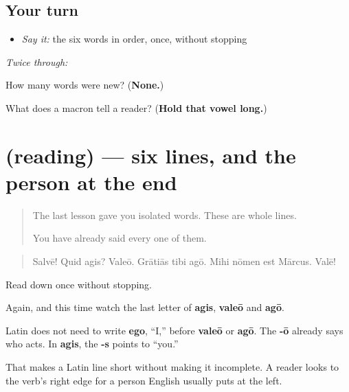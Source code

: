 \subsection*{Your turn}
\begin{itemize}
\raggedright
  \item \emph{Say it:} the six words in order, once, without stopping
\end{itemize}

\emph{Twice through:}

\begin{tcolorbox}[breakable,colback=teal!4,colframe=teal!35!black,title={Before you move on}]
How many words were new? (\textbf{None.})

What does a macron tell a reader? (\textbf{Hold that vowel long.})
\end{tcolorbox}
\section[(reading)]{(reading) — six lines, and the person at the end}

\label{lesson:LA-C58-lineae}



\begin{quote}
The last lesson gave you isolated words. These are whole lines.

You have already said every one of them.
\end{quote}

\begin{tcolorbox}[breakable,skin=enhanced,colback=orange!6,colframe=orange!45!black,boxrule=0.5pt,arc=1mm,left=6pt,right=6pt,top=4pt,bottom=4pt,fonttitle=\bfseries,title={Read this}]
\begin{quote}
Salvē! Quid agis? Valeō. Grātiās tibi agō. Mihi nōmen est Mārcus. Valē!
\end{quote}

Read down once without stopping.

Again, and this time watch the last letter of \textbf{agis}, \textbf{valeō} and \textbf{agō}.
\end{tcolorbox}

\begin{grammarlens}[title={Grammar Lens: the person rides on the verb}]
Latin does not need to write \textbf{ego}, “I,” before \textbf{valeō} or \textbf{agō}. The \textbf{-ō} already says who acts. In \textbf{agis}, the \textbf{-s} points to “you.”

That makes a Latin line short without making it incomplete. A reader looks to the verb's right edge for a person English usually puts at the left.
\end{grammarlens}

